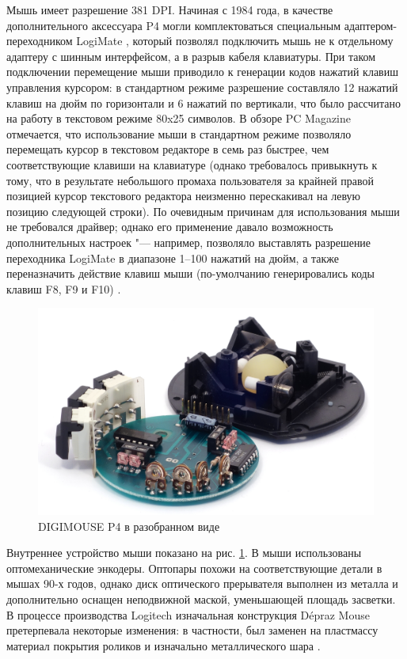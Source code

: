 \documentclass[11pt, a4paper]{article}
\begin{document}
Мышь имеет разрешение 381 DPI. Начиная с 1984 года, в качестве дополнительного аксессуара P4 могли комплектоваться специальным адаптером-переходником LogiMate \cite{oldmouse}, который позволял подключить мышь не к отдельному адаптеру с шинным интерфейсом, а в разрыв кабеля клавиатуры. При таком подключении перемещение мыши приводило к генерации кодов нажатий клавиш управления курсором: в стандартном режиме разрешение составляло 12 нажатий клавиш на дюйм по горизонтали и 6 нажатий по вертикали, что было рассчитано на работу в текстовом режиме 80x25 символов. В обзоре PC Magazine отмечается, что использование мыши в стандартном режиме позволяло перемещать курсор в текстовом редакторе в семь раз быстрее, чем соответствующие клавиши на клавиатуре (однако требовалось привыкнуть к тому, что в результате небольшого промаха пользователя за крайней правой позицией курсор текстового редактора неизменно перескакивал на левую позицию следующей строки). По очевидным причинам для использования мыши не требовался драйвер; однако его применение давало возможность дополнительных настроек "--- например, позволяло выставлять разрешение переходника LogiMate в диапазоне 1--100 нажатий на дюйм, а также переназначить действие клавиш мыши (по-умолчанию генерировались коды клавиш F8, F9 и F10) \cite{DIGIMOUSE}.

 \begin{figure}[h]
    \centering
    \includegraphics[scale=0.7]{1982_depraz_digimouse/inside_60.jpg}
    \caption{DIGIMOUSE P4 в разобранном виде}
    \label{fig:DIGIMOUSEP4Inside}
\end{figure}

Внутреннее устройство мыши показано на рис. \ref{fig:DIGIMOUSEP4Inside}. В мыши использованы оптомеханические энкодеры. Оптопары похожи на соответствующие детали в мышах 90-х годов, однако диск оптического прерывателя выполнен из металла и дополнительно оснащен неподвижной маской, уменьшающей площадь засветки. В процессе производства Logitech изначальная конструкция Dépraz Mouse претерпевала некоторые изменения: в частности, был заменен на пластмассу материал покрытия роликов и изначально металлического шара \cite{oldmouse}.
\end{document}
